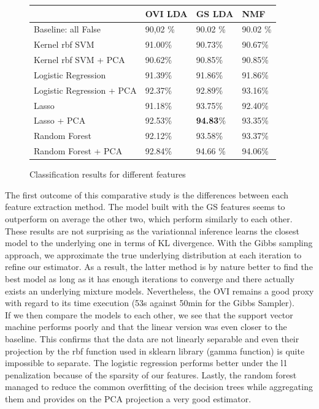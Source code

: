 \documentclass[twoside]{article}
\begin{document}
\begin{multicols}{2}
\begin{figure}[H]
\begin{center}
    \begin{tabular}{| l | l | l | l |}
    \hline
    & OVI LDA & GS LDA & NMF \\ \hline
    Baseline: all False & 90,02 \% &  90.02 \% &  90.02 \% \\ \hline
    Kernel rbf SVM & 91.00\%  &  90.73\%  &  90.67\% \\ \hline
    Kernel rbf SVM + PCA & 90.62\%  &  90.85\%  &  90.85\% \\ \hline
    Logistic Regression & 91.39\%  &  91.86\%  &  91.86\%\\ \hline
    Logistic Regression + PCA & 92.37\%  &  92.89\%  &  93.16\% \\ \hline
    Lasso & 91.18\%  &  93.75\%  &  92.40\% \\ \hline
	Lasso + PCA & 92.53\%  &  \textbf{94.83}\%  &  93.35\% \\ \hline
    Random Forest & 92.12\% &  93.58\% &  93.37\% \\ \hline
    Random Forest + PCA & 92.84\% &  94.66 \% &  94.06\% \\ \hline
    \end{tabular}
\end{center}
\caption{Classification results for different features}
\end{figure}

\noindent The first outcome of this comparative study is the differences between each feature extraction method. The model built with the GS features seems to outperform on average the other two, which perform similarly to each other. These results are not surprising as the variationnal inference learns the closest model to the underlying one in terms of KL divergence. With the Gibbs sampling approach, we approximate the true underlying distribution at each iteration to refine our estimator. As a result, the latter method is by nature better to find the best model as long as it has enough iterations to converge and there actually exists an underlying mixture models. Nevertheless, the OVI remains a good proxy with regard to its time execution (53s against 50min for the Gibbs Sampler).\\

\noindent If we then compare the models to each other, we see that the support vector machine performs poorly and that the linear version was even closer to the baseline. This confirms that the data are not linearly separable and even their projection by the rbf function used in sklearn library (gamma function) is quite impossible to separate. The logistic regression performs better under the l1 penalization because of the sparsity of our features. Lastly, the random forest managed to reduce the common overfitting of the decision trees while aggregating them and provides on the PCA projection a very good estimator.\\


\end{multicols}
\end{document}
